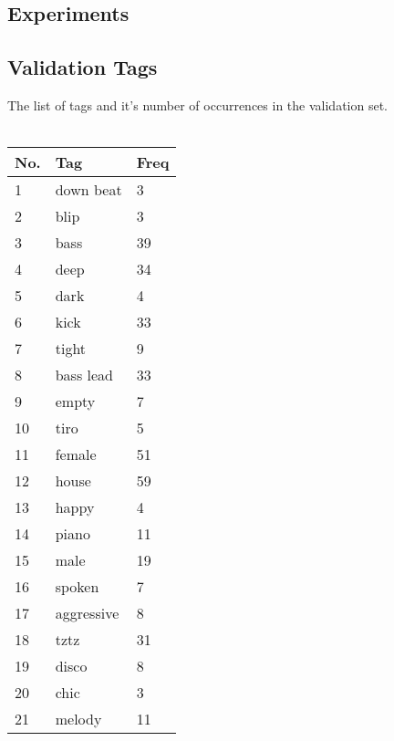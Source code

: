 

\begin{appendices}

\chapter{Experiments}
\section{Validation Tags}
The list of tags and it's number of occurrences in the validation set.\\
\\
\begin{tabular}{| p{} | p{} | p{}|}
\hline
\textbf{No.} & \textbf{Tag} & \textbf{Freq}\\
\hline
1 & down beat & 3\\
\hline
2 & blip & 3 \\
\hline
3 & bass & 39 \\
\hline
4 & deep & 34 \\
\hline
5 & dark & 4\\
\hline
6 & kick & 33\\
\hline
7 & tight & 9\\
\hline
8 & bass lead & 33\\
\hline
9 & empty & 7\\
\hline
10 & tiro & 5\\
\hline
11 & female & 51\\
\hline
12 & house & 59\\
\hline
13 & happy & 4\\
\hline
14 & piano & 11\\
\hline
15 & male & 19\\
\hline
16 & spoken & 7 \\
\hline
17 & aggressive & 8\\
\hline
18 & tztz & 31\\
\hline
19 & disco & 8\\
\hline
20 & chic & 3\\
\hline
21 & melody & 11\\
\hline
\end{tabular}

\end{appendices}
